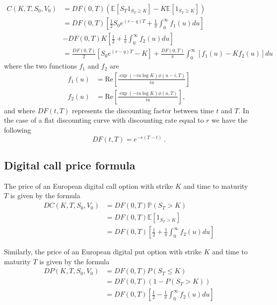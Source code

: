 \begin{equation}
\begin{aligned}
C(K,T, S_0, V_0) & = DF(0,T) \left(	\mathbb{E}\left[S_T 1_{S_T \geq K} \right] - K \mathbb{E}\left[1_{S_T \geq K} \right]\right) \\
&= DF(0,T) \left[ \frac{1}{2}S_0e^{(r-q) T}+ \frac{1}{\pi}\int_0^{\infty}f_1(u) du  \right] \\
&- DF(0,T) K   \left[ \frac{1}{2} + \frac{1}{\pi}\int_0^{\infty}f_2(u) du \right]  \\
&=  \frac{DF(0,T)}{2}\left[S_0e^{(r-q) T} - K\right] + \frac{DF(0,T)}{\pi}\int_0^{\infty}\left[f_1(u) - Kf_2(u)\right]du
\end{aligned}
\end{equation}
where the two functions $f_1$ and $f_2$ are
\begin{align}
f_1(u) & = \mathrm{Re}\left[\frac{\exp(-iu\log K)\phi(u-i,T)}{iu}\right]\\
f_2(u) & = \mathrm{Re}\left[\frac{\exp(-iu\log K)\phi(u,T)}{iu}\right],
\end{align}
and where $DF(t,T)$ represents the discounting factor between time $t$ and $T$. 
In the case of a flat discounting curve with discounting rate equal to $r$ we have the following
$$
DF(t,T) = e^{-r(T-t)} \ .
$$


\subsection{Digital call price formula}
\label{digital}
The price of an European digital call option with strike $K$ and time to maturity $T$ is given by the formula
\begin{equation}
\begin{aligned}
DC(K,T, S_0, V_0) &=DF(0,T) \mathbb{P}(S_T > K) \\ &=  DF(0,T)\mathbb{E}\left[1_{S_T > K}\right] \\
&= DF(0,T) \left[ \frac{1}{2} + \frac{1}{\pi}\int_0^{\infty}f_2(u) du \right] 
\end{aligned}
\end{equation}

Similarly, the price of an European digital put option with strike $K$ and time to maturity $T$ is given by the formula
\begin{equation}
\begin{aligned}
DP(K,T, S_0, V_0) &= DF(0,T) P(S_T \leq K) \\ 
&= DF(0,T) (1-P(S_T > K))  \\ 
& = DF(0,T)  \left[  \frac{1}{2} - \frac{1}{\pi}\int_0^{\infty}f_2(u) du \right] 
\end{aligned} 
\end{equation}


